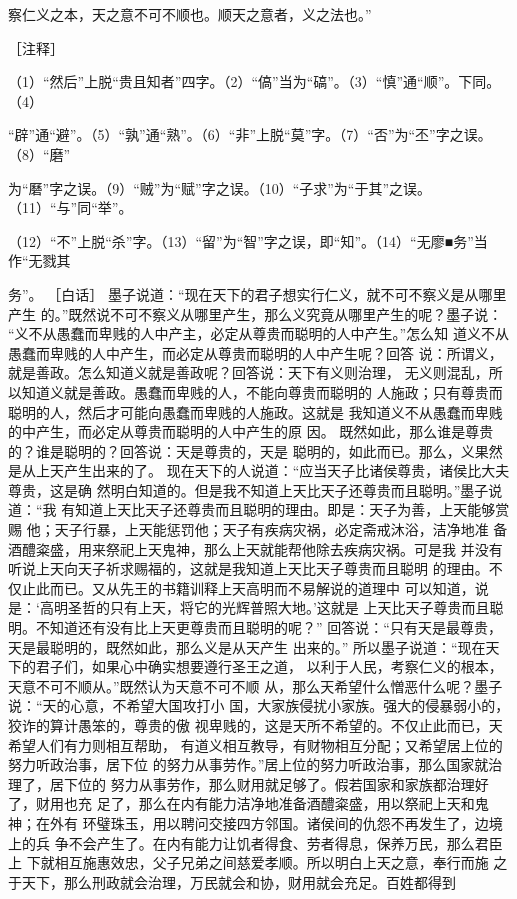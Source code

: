 \documentclass[12pt,UTF8]{ctexbook}
\begin{document}
察仁义之本，天之意不可不顺也。顺天之意者，义之法也。” 


［注释］ 

（1）“然后”上脱“贵且知者”四字。（2）“傐”当为“碻”。（3）“慎”通“顺”。下同。（4） 

“辟”通“避”。（5）“孰”通“熟”。（6）“非”上脱“莫”字。（7）“否”为“丕”字之误。（8）“磨” 

为“磿”字之误。（9）“贼”为“赋”字之误。（10）“子求”为“于其”之误。（11）“与”同“举”。 

（12）“不”上脱“杀”字。（13）“留”为“智”字之误，即“知”。（14）“无廖■务”当作“无戮其 

务”。 
［白话］ 
墨子说道：“现在天下的君子想实行仁义，就不可不察义是从哪里产生 
的。”既然说不可不察义从哪里产生，那么义究竟从哪里产生的呢？墨子说： 
“义不从愚蠢而卑贱的人中产主，必定从尊贵而聪明的人中产生。”怎么知 
道义不从愚蠢而卑贱的人中产生，而必定从尊贵而聪明的人中产生呢？回答 
说：所谓义，就是善政。怎么知道义就是善政呢？回答说：天下有义则治理， 
无义则混乱，所以知道义就是善政。愚蠢而卑贱的人，不能向尊贵而聪明的 
人施政；只有尊贵而聪明的人，然后才可能向愚蠢而卑贱的人施政。这就是 
我知道义不从愚蠢而卑贱的中产生，而必定从尊贵而聪明的人中产生的原 
因。 
既然如此，那么谁是尊贵的？谁是聪明的？回答说：天是尊贵的，天是 
聪明的，如此而已。那么，义果然是从上天产生出来的了。 
现在天下的人说道：“应当天子比诸侯尊贵，诸侯比大夫尊贵，这是确 
然明白知道的。但是我不知道上天比天子还尊贵而且聪明。”墨子说道：“我 
有知道上天比天子还尊贵而且聪明的理由。即是：天子为善，上天能够赏赐 
他；天子行暴，上天能惩罚他；天子有疾病灾祸，必定斋戒沐浴，洁净地准 
备酒醴粢盛，用来祭祀上天鬼神，那么上天就能帮他除去疾病灾祸。可是我 
并没有听说上天向天子祈求赐福的，这就是我知道上天比天子尊贵而且聪明 
的理由。不仅止此而已。又从先王的书籍训释上天高明而不易解说的道理中 
可以知道，说是：‘高明圣哲的只有上天，将它的光辉普照大地。’这就是 
上天比天子尊贵而且聪明。不知道还有没有比上天更尊贵而且聪明的呢？” 
回答说：“只有天是最尊贵，天是最聪明的，既然如此，那么义是从天产生 
出来的。” 
所以墨子说道：“现在天下的君子们，如果心中确实想要遵行圣王之道， 
以利于人民，考察仁义的根本，天意不可不顺从。”既然认为天意不可不顺 
从，那么天希望什么憎恶什么呢？墨子说：“天的心意，不希望大国攻打小 
国，大家族侵扰小家族。强大的侵暴弱小的，狡诈的算计愚笨的，尊贵的傲 
视卑贱的，这是天所不希望的。不仅止此而已，天希望人们有力则相互帮助， 
有道义相互教导，有财物相互分配；又希望居上位的努力听政治事，居下位 
的努力从事劳作。”居上位的努力听政治事，那么国家就治理了，居下位的 
努力从事劳作，那么财用就足够了。假若国家和家族都治理好了，财用也充 
足了，那么在内有能力洁净地准备酒醴粢盛，用以祭祀上天和鬼神；在外有 
环璧珠玉，用以聘问交接四方邻国。诸侯间的仇怨不再发生了，边境上的兵 
争不会产生了。在内有能力让饥者得食、劳者得息，保养万民，那么君臣上 
下就相互施惠效忠，父子兄弟之间慈爱孝顺。所以明白上天之意，奉行而施 
之于天下，那么刑政就会治理，万民就会和协，财用就会充足。百姓都得到 
\end{document}
